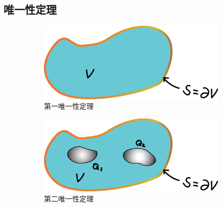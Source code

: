 \documentclass{ctexart}
\begin{document}

\subsection{唯一性定理} %
\label{sub:唯一性定理}

\begin{figure}[hb]
	\centering
	\begin{subfigure}{.3\textwidth}
		\centering
		\includegraphics[width=\linewidth]{src/UniquenessTheoremI.eps}
		\caption{第一唯一性定理}
		\label{fig:第一唯一性定理}
	\end{subfigure}
	\begin{subfigure}{.3\textwidth}
		\centering
		\includegraphics[width=\linewidth]{src/UniquenessTheoremII.eps}
		\caption{第二唯一性定理}
		\label{fig:第二唯一性定理}
	\end{subfigure}
	\caption{}
\end{figure}
\end{document}
